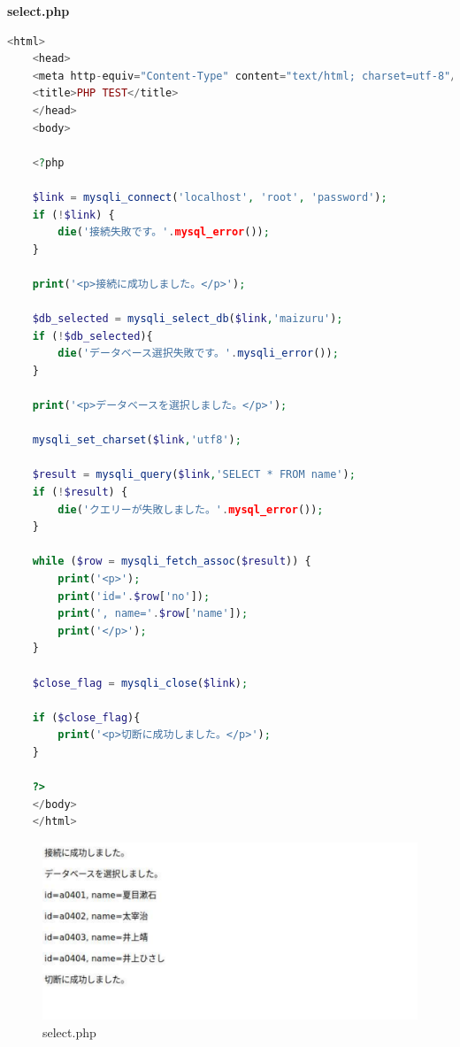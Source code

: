 \textbf{select.php}
\begin{lstlisting}[language=php]
    <html>
    <head>
    <meta http-equiv="Content-Type" content="text/html; charset=utf-8"/>
    <title>PHP TEST</title>
    </head>
    <body>
    
    <?php
    
    $link = mysqli_connect('localhost', 'root', 'password');
    if (!$link) {
        die('接続失敗です。'.mysql_error());
    }
    
    print('<p>接続に成功しました。</p>');
    
    $db_selected = mysqli_select_db($link,'maizuru');
    if (!$db_selected){
        die('データベース選択失敗です。'.mysqli_error());
    }
    
    print('<p>データベースを選択しました。</p>');
    
    mysqli_set_charset($link,'utf8');
    
    $result = mysqli_query($link,'SELECT * FROM name');
    if (!$result) {
        die('クエリーが失敗しました。'.mysql_error());
    }
    
    while ($row = mysqli_fetch_assoc($result)) {
        print('<p>');
        print('id='.$row['no']);
        print(', name='.$row['name']);
        print('</p>');
    }
    
    $close_flag = mysqli_close($link);
    
    if ($close_flag){
        print('<p>切断に成功しました。</p>');
    }
    
    ?>
    </body>
    </html>
\end{lstlisting}
\begin{figure}[htbp]
  \centering
  \includegraphics[width=0.9\linewidth]{figure/7.pdf}
  \caption{select.php}
\end{figure}

